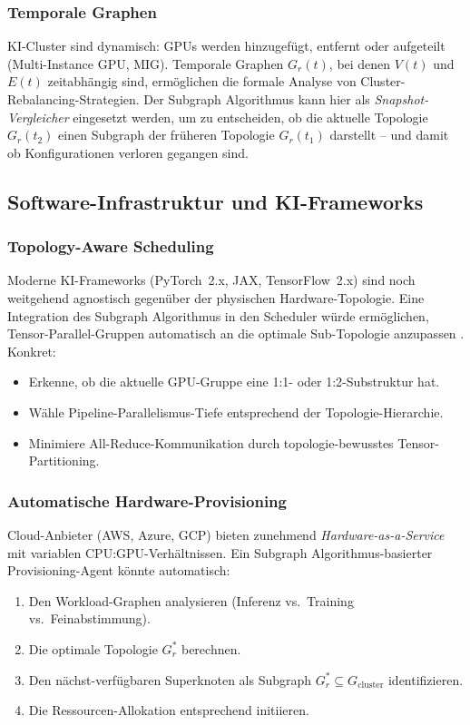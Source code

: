 ﻿\documentclass[a4paper,12pt]{article}
\theoremstyle{definition}
\begin{document}
\subsubsection{Temporale Graphen}

KI-Cluster sind dynamisch: GPUs werden hinzugef\"ugt, entfernt oder
aufgeteilt (Multi-Instance GPU, MIG). Temporale Graphen $G_r(t)$,
bei denen $V(t)$ und $E(t)$ zeitabh\"angig sind, erm\"oglichen die
formale Analyse von Cluster-Rebalancing-Strategien. Der Subgraph
Algorithmus kann hier als \emph{Snapshot-Vergleicher} eingesetzt werden,
um zu entscheiden, ob die aktuelle Topologie $G_r(t_2)$ einen Subgraph
der fr\"uheren Topologie $G_r(t_1)$ darstellt -- und damit ob Konfigurationen
verloren gegangen sind.

\subsection{Software-Infrastruktur und KI-Frameworks}

\subsubsection{Topology-Aware Scheduling}

Moderne KI-Frameworks (PyTorch~2.x, JAX, TensorFlow~2.x) sind noch
weitgehend agnostisch gegen\"uber der physischen Hardware-Topologie.
Eine Integration des Subgraph Algorithmus in den Scheduler w\"urde
erm\"oglichen, Tensor-Parallel-Gruppen automatisch an die optimale
Sub-Topologie anzupassen \cite{megatron2021}. Konkret:
\begin{itemize}
  \item Erkenne, ob die aktuelle GPU-Gruppe eine 1:1- oder 1:2-Substruktur hat.
  \item W\"ahle Pipeline-Parallelismus-Tiefe entsprechend der Topologie-Hierarchie.
  \item Minimiere All-Reduce-Kommunikation durch topologie-bewusstes
        Tensor-Partitioning.
\end{itemize}

\subsubsection{Automatische Hardware-Provisioning}

Cloud-Anbieter (AWS, Azure, GCP) bieten zunehmend \emph{Hardware-as-a-Service}
mit variablen CPU:GPU-Verh\"altnissen. Ein Subgraph Algorithmus-basierter
Provisioning-Agent k\"onnte automatisch:
\begin{enumerate}
  \item Den Workload-Graphen analysieren (Inferenz vs.\ Training vs.\ Feinabstimmung).
  \item Die optimale Topologie $G_r^*$ berechnen.
  \item Den n\"achst-verf\"ugbaren Superknoten als Subgraph $G_r^* \subseteq G_\text{cluster}$
        identifizieren.
  \item Die Ressourcen-Allokation entsprechend initiieren.
\end{enumerate}
\end{document}
